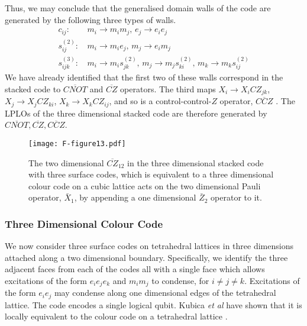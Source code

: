 \documentclass[pra,twocolumn,a4paper,nofootinbib]{revtex4-1}
\begin{document}
Thus, we may conclude that the generalised domain walls of the code are generated by the following three types of walls.
\begin{align}
c_{ij}:&\, m_i \to m_im_j,\, e_j \to e_i e_j\\
s_{ij}^{(2)}:&\, m_i \to m_ie_j,\, m_j \to e_i m_j\\
s_{ijk}^{(3)}:&\, m_i \to m_i s^{(2)}_{jk},\, m_j \to m_j s^{(2)}_{ki},\, m_k \to m_k s^{(2)}_{ij}
\end{align}
We have already identified that the first two of these walls correspond in the stacked code to $\overline{CNOT}$ and $\overline{CZ}$ operators. The third maps $X_i \to X_i CZ_{jk}$, $X_j \to X_j CZ_{ki}$, $X_k \to X_k CZ_{ij}$, and so is a control-control-$Z$ operator, $\overline{CCZ}$ \cite{YoshidaC}. The LPLOs of the three dimensional stacked code are therefore generated by $\overline{CNOT}, \overline{CZ}, \overline{CCZ}$.

\begin{figure}
\centering
\texttt{[image: F-figure13.pdf]}
\caption{The two dimensional $\overline{CZ}_{12}$ in the three dimensional stacked code with three surface codes, which is equivalent to a three dimensional colour code on a cubic lattice \cite{Kubica} acts on the two dimensional Pauli operator, $\bar{X}_1$, by appending a one dimensional $\bar{Z}_2$ operator to it.\label{3DCZ}}
\end{figure}

\subsubsection{Three Dimensional Colour Code}
We now consider three surface codes on tetrahedral lattices in three dimensions attached along a two dimensional boundary. Specifically, we identify the three adjacent faces from each of the codes all with a single face which allows excitations of the form $e_ie_je_k$ and $m_im_j$ to condense, for $i \neq j \neq k$. Excitations of the form $e_ie_j$ may condense along one dimensional edges of the tetrahedral lattice. The code encodes a single logical qubit. Kubica \textit{et al} have shown that it is locally equivalent to the colour code on a tetrahedral lattice \cite{Kubica}.
\end{document}
